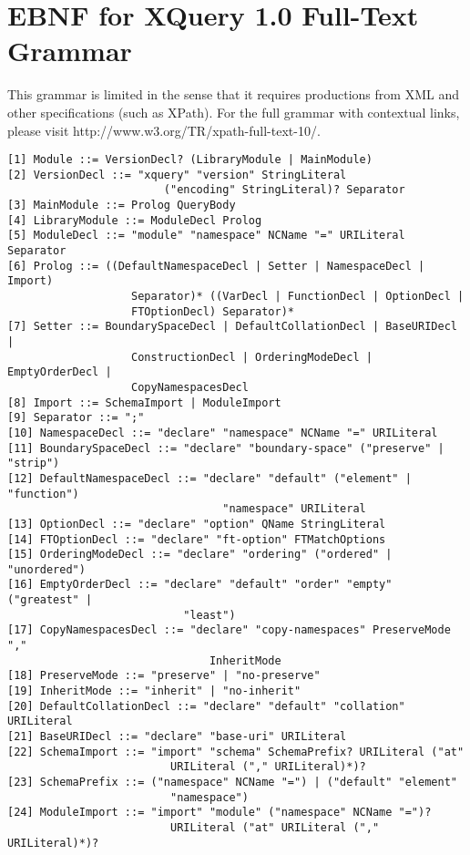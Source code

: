 \chapter{EBNF for XQuery 1.0 Full-Text Grammar}
This grammar is limited in the sense that it requires productions from XML and
other specifications (such as XPath). For the full grammar with contextual
links, please visit http://www.w3.org/TR/xpath-full-text-10/. 

\begin{Verbatim}[frame=none, fontsize=\footnotesize]
[1] Module ::= VersionDecl? (LibraryModule | MainModule)
[2] VersionDecl ::= "xquery" "version" StringLiteral 
                        ("encoding" StringLiteral)? Separator
[3] MainModule ::= Prolog QueryBody
[4] LibraryModule ::= ModuleDecl Prolog
[5] ModuleDecl ::= "module" "namespace" NCName "=" URILiteral Separator
[6] Prolog ::= ((DefaultNamespaceDecl | Setter | NamespaceDecl | Import)
                   Separator)* ((VarDecl | FunctionDecl | OptionDecl |
                   FTOptionDecl) Separator)*
[7] Setter ::= BoundarySpaceDecl | DefaultCollationDecl | BaseURIDecl |
                   ConstructionDecl | OrderingModeDecl | EmptyOrderDecl |
                   CopyNamespacesDecl 
[8] Import ::= SchemaImport | ModuleImport 
[9] Separator ::= ";"
[10] NamespaceDecl ::= "declare" "namespace" NCName "=" URILiteral
[11] BoundarySpaceDecl ::= "declare" "boundary-space" ("preserve" | "strip")
[12] DefaultNamespaceDecl ::= "declare" "default" ("element" | "function")
                                 "namespace" URILiteral
[13] OptionDecl ::= "declare" "option" QName StringLiteral
[14] FTOptionDecl ::= "declare" "ft-option" FTMatchOptions
[15] OrderingModeDecl ::= "declare" "ordering" ("ordered" | "unordered")
[16] EmptyOrderDecl ::= "declare" "default" "order" "empty" ("greatest" |
                           "least")
[17] CopyNamespacesDecl ::= "declare" "copy-namespaces" PreserveMode ","
                               InheritMode 
[18] PreserveMode ::= "preserve" | "no-preserve" 
[19] InheritMode ::= "inherit" | "no-inherit"
[20] DefaultCollationDecl ::= "declare" "default" "collation" URILiteral
[21] BaseURIDecl ::= "declare" "base-uri" URILiteral
[22] SchemaImport ::= "import" "schema" SchemaPrefix? URILiteral ("at"
                         URILiteral ("," URILiteral)*)?
[23] SchemaPrefix ::= ("namespace" NCName "=") | ("default" "element"
                         "namespace")
[24] ModuleImport ::= "import" "module" ("namespace" NCName "=")?
                         URILiteral ("at" URILiteral ("," URILiteral)*)?

\end{Verbatim}
